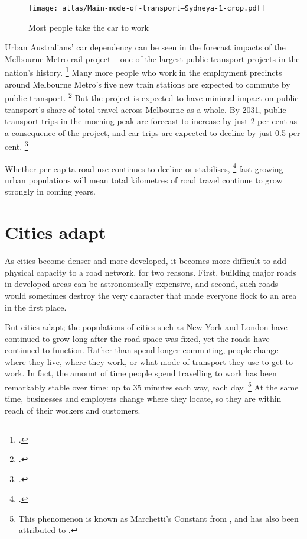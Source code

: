 \documentclass{grattan}
\begin{document}
\begin{figure}
\caption{Most people take the car to work \label{fig:Mode-of-travel}}
\texttt{[image: atlas/Main-mode-of-transport--Sydneya-1-crop.pdf]}
\end{figure}

Urban Australians' car dependency can be seen in the forecast impacts of the Melbourne Metro rail project -- one of the largest public transport projects in the nation's history.%
    \footcite{MelbourneMetro-2016-BizCase}
Many more people who work in the employment precincts around Melbourne Metro's five new train stations are expected to commute by public transport.%
    \footcite[][166--167]{MelbourneMetro-2016-BizCase}
But the project is expected to have minimal impact on public transport's share of total travel across Melbourne as a whole. By 2031, public transport trips in the morning peak are forecast to increase by just 2 per cent as a consequence of the project, and car trips are expected to decline by just 0.5 per cent.%
    \footcite{Urbanist-2016-Melb-metro-What-do-you-get-for-10bn}

Whether per capita road use continues to decline or stabilises,
\footcite[][9]{BITRE-2015-Traffic-and-congestion-cost-trends-for-Aust-capital-cities}
fast-growing urban populations will mean total kilometres of road travel continue to grow strongly in coming years.

\section{Cities adapt}

As cities become denser and more developed, it becomes more difficult to add physical capacity to a road network, for two reasons.
First, building major roads in developed areas can be astronomically expensive, and second, such roads would sometimes destroy the very character that made everyone flock to an area in the first place.

But cities adapt; the populations of cities such as New York and London have continued to grow long after the road space was fixed, yet the roads have continued to function.
Rather than spend longer commuting, people change where they live, where they work, or what mode of transport they use to get to work. In fact, the amount of time people spend travelling to work has been remarkably stable over time: up to 35 minutes each way, each day.%
    \footnote{This phenomenon is known as Marchetti's Constant from \textcite{marchetti1994anthropological}, and has also been attributed to \textcites{Zahavi-1979-UMOT-Urban-interactions}{Zahavi-1981-UMOT-Urban-interactions}.}
At the same time, businesses and employers change where they locate, so they are within reach of their workers and customers.
\end{document}

